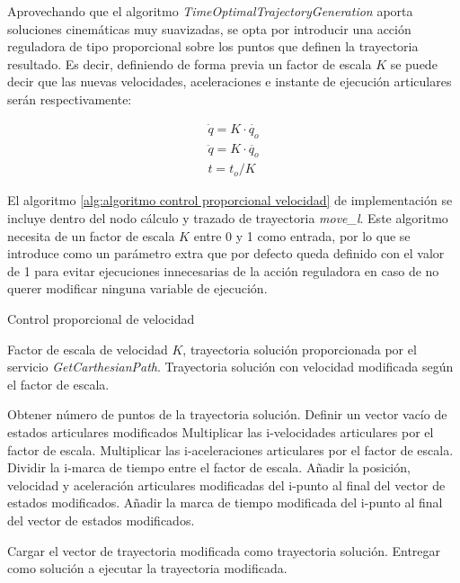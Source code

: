 Aprovechando que el algoritmo \textit{TimeOptimalTrajectoryGeneration} aporta soluciones cinemáticas muy suavizadas, se opta por introducir una acción reguladora de tipo proporcional sobre los puntos que definen la trayectoria resultado. Es decir, definiendo de forma previa un factor de escala $K$ se puede decir que las nuevas velocidades, aceleraciones e instante de ejecución articulares serán respectivamente:

\begin{gather}
    \dot{q}= K\cdot \dot{q_o} \\
    \ddot{q}= K\cdot \ddot{q_o} \\
    t = t_o/K
\end{gather}

El algoritmo \ref{alg:algoritmo control proporcional velocidad} de implementación se incluye dentro del nodo cálculo y trazado de trayectoria \textit{move\_l}. Este algoritmo necesita de un factor de escala $K$ entre 0 y 1 como entrada, por lo que se introduce como un parámetro extra que por defecto queda definido con el valor de 1 para evitar ejecuciones innecesarias de la acción reguladora en caso de no querer modificar ninguna variable de ejecución.

\begin{algorithm}[h!]
\caption{Control proporcional de velocidad}\label{alg:algoritmo control proporcional velocidad}
\begin{algorithmic}[1]
\Require Factor de escala de velocidad $K$, trayectoria solución proporcionada por el servicio \textit{GetCarthesianPath}.
\Ensure Trayectoria solución con velocidad modificada según el factor de escala.

\State Obtener número de puntos de la trayectoria solución.
\State Definir un vector vacío de estados articulares modificados
    \State Multiplicar las i-velocidades articulares por el factor de escala.
    \State Multiplicar las i-aceleraciones articulares por el factor de escala.
    \State Dividir la i-marca de tiempo entre el factor de escala.
    \State Añadir la posición, velocidad y aceleración articulares modificadas del i-punto al final del vector de estados modificados.
    \State Añadir la marca de tiempo modificada del i-punto al final del vector de estados modificados.
\EndFor

\State Cargar el vector de trayectoria modificada como trayectoria solución.
\State Entregar como solución a ejecutar la trayectoria modificada.
\end{algorithmic}
\end{algorithm}

